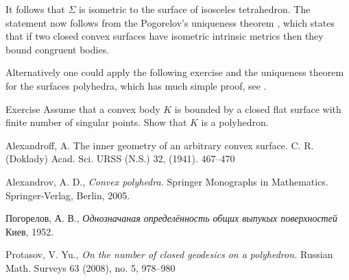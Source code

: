 \documentclass[oneside,a4paper, 12pt]{article}
\begin{document}
It follows that $\Sigma$ is isometric to the surface of isosceles tetrahedron.
The statement now follows from the Pogorelov's uniqueness theorem \cite{pogorelov},
which states that if two closed convex surfaces have isometric intrinsic metrics then they bound congruent bodies.

Alternatively one could apply the following exercise and the uniqueness theorem for the surfaces polyhedra, which has much simple proof, see \cite{alexandrov1950}.
\qeds

\begin{thm}{Exercise}
Assume that a convex body $K$ is bounded by a closed flat surface with finite number of singular points.
Show that $K$ is a polyhedron.
\end{thm}

\begin{thebibliography}{52}
Alexandroff, A. 
The inner geometry of an arbitrary convex surface. C. R. (Doklady) 
Acad. Sci. URSS (N.S.) 
32, 
(1941). 
467--470

Alexandrov, A. D.,
\emph{Convex polyhedra.}
Springer Monographs in Mathematics. Springer-Verlag, Berlin, 2005.

\begin{otherlanguage}{russian}
Погорелов, А. В.,
\emph{Однозначаная определённость общих выпукых поверхностей}
Киев, 1952.
\end{otherlanguage}



 Protasov, V. Yu.,
\emph{On the number of closed geodesics on a polyhedron.}  Russian Math. Surveys 63 (2008), no. 5, 978--980
\end{thebibliography}
\end{document}
